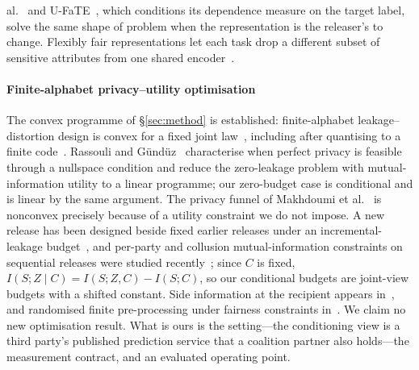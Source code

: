 al.~\cite{sadeghi2019sarl,sadeghi2021optnetarl,sadeghi2022ktopt} and U-FaTE~\cite{dehdashtian2024ufate},
which conditions its dependence measure on the target label, solve the same shape of problem when the
representation is the releaser's to change. Flexibly fair representations let each task drop a different
subset of sensitive attributes from one shared encoder~\cite{creager2019ffvae}.

\paragraph{Finite-alphabet privacy--utility optimisation} The convex programme of \S\ref{sec:method} is
established: finite-alphabet leakage--distortion design is convex for a fixed joint
law~\cite{calmon2012privacy}, including after quantising to a finite code~\cite{salamatian2015managing}.
Rassouli and G\"und\"uz~\cite{rassouli2021perfect} characterise when perfect privacy is feasible through a
nullspace condition and reduce the zero-leakage problem with mutual-information utility to a linear
programme; our zero-budget case is conditional and is linear by the same argument. The privacy funnel of
Makhdoumi et al.~\cite{makhdoumi2014funnel} is nonconvex precisely because of a utility constraint we do
not impose. A new release has been designed beside fixed earlier releases under an incremental-leakage
budget~\cite{erdogdu2015continual}, and per-party and collusion mutual-information constraints on
sequential releases were studied recently~\cite{taylor2026collusion}; since $C$ is fixed,
$I(S;Z\mid C)=I(S;Z,C)-I(S;C)$, so our conditional budgets are joint-view budgets with a shifted
constant. Side information at the recipient appears in~\cite{sankar2013utility,liao2019sideinfo}, and
randomised finite pre-processing under fairness constraints in~\cite{calmon2017optimized}. We claim no new
optimisation result. What is ours is the setting---the conditioning view is a third party's published
prediction service that a coalition partner also holds---the measurement contract, and an evaluated
operating point.
